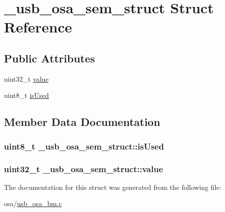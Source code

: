 \hypertarget{struct__usb__osa__sem__struct}{\section{\-\_\-usb\-\_\-osa\-\_\-sem\-\_\-struct Struct Reference}
\label{struct__usb__osa__sem__struct}
}
\subsection*{Public Attributes}
\begin{DoxyCompactItemize}
\item 
uint32\-\_\-t \hyperlink{struct__usb__osa__sem__struct_afb12fd6ea4a03d92bcc0caa9f3acf27e}{value}
\item 
uint8\-\_\-t \hyperlink{struct__usb__osa__sem__struct_ae6fbe11cbb4412d81a8efd3e00f871c0}{is\-Used}
\end{DoxyCompactItemize}


\subsection{Member Data Documentation}
\hypertarget{struct__usb__osa__sem__struct_ae6fbe11cbb4412d81a8efd3e00f871c0}{
\subsubsection[{is\-Used}]{\setlength{\rightskip}{0pt plus 5cm}uint8\-\_\-t \-\_\-usb\-\_\-osa\-\_\-sem\-\_\-struct\-::is\-Used}}\label{struct__usb__osa__sem__struct_ae6fbe11cbb4412d81a8efd3e00f871c0}
\hypertarget{struct__usb__osa__sem__struct_afb12fd6ea4a03d92bcc0caa9f3acf27e}{
\subsubsection[{value}]{\setlength{\rightskip}{0pt plus 5cm}uint32\-\_\-t \-\_\-usb\-\_\-osa\-\_\-sem\-\_\-struct\-::value}}\label{struct__usb__osa__sem__struct_afb12fd6ea4a03d92bcc0caa9f3acf27e}


The documentation for this struct was generated from the following file\-:\begin{DoxyCompactItemize}
\item 
osa/\hyperlink{usb__osa__bm_8c}{usb\-\_\-osa\-\_\-bm.\-c}\end{DoxyCompactItemize}
